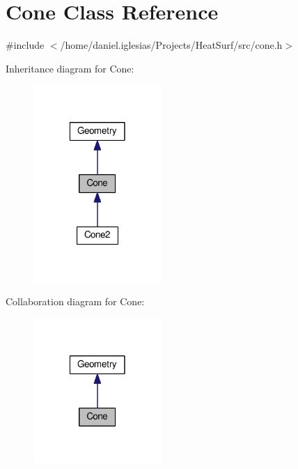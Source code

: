 \hypertarget{classCone}{\section{Cone Class Reference}
\label{classCone}
}


{\ttfamily \#include $<$/home/daniel.\-iglesias/\-Projects/\-Heat\-Surf/src/cone.\-h$>$}



Inheritance diagram for Cone\-:\nopagebreak
\begin{figure}[H]
\begin{center}
\leavevmode
\includegraphics[width=138pt]{classCone__inherit__graph}
\end{center}
\end{figure}


Collaboration diagram for Cone\-:\nopagebreak
\begin{figure}[H]
\begin{center}
\leavevmode
\includegraphics[width=138pt]{classCone__coll__graph}
\end{center}
\end{figure}
